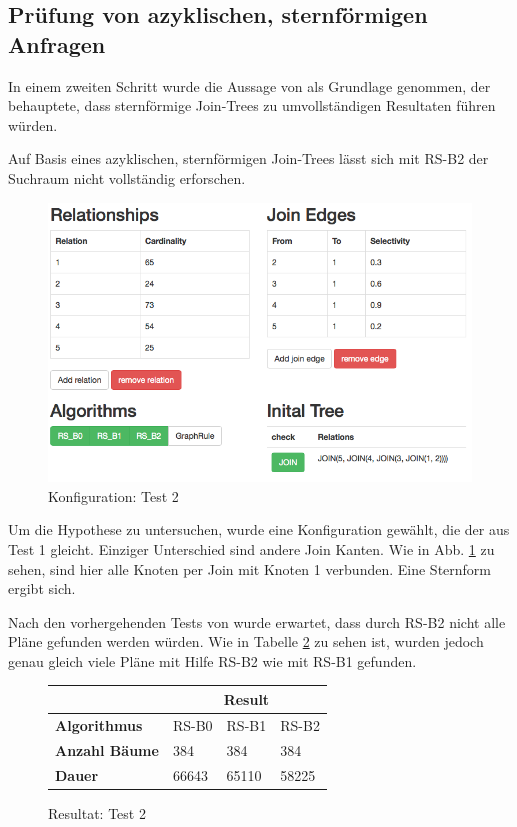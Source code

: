 \subsection{Prüfung von azyklischen, sternförmigen Anfragen}

In einem zweiten Schritt wurde die Aussage von \cite{shanbhag2014optimizing} als Grundlage genommen, der behauptete, dass sternförmige Join-Trees zu umvollständigen Resultaten führen würden.


\begin{hypo}
Auf Basis eines azyklischen, sternförmigen Join-Trees lässt sich mit RS-B2 der Suchraum nicht vollständig erforschen.
\end{hypo}


\begin{figure}[ht]
  \centering
  \includegraphics[width=\textwidth]{05_ResultsEvaluation/00_media/Test2.png}
  \caption{Konfiguration: Test 2}
  \label{Konfiguration:Test2}
\end{figure}


Um die Hypothese zu untersuchen, wurde eine Konfiguration gewählt, die der aus Test 1 gleicht. Einziger Unterschied sind andere Join Kanten. Wie in  Abb. \ref{Konfiguration:Test2} zu sehen, sind hier alle Knoten per Join mit Knoten 1 verbunden. Eine Sternform ergibt sich.

Nach den vorhergehenden Tests von \cite{shanbhag2014optimizing} wurde erwartet, dass durch RS-B2 nicht alle Pläne gefunden werden würden. Wie in Tabelle \ref{Result:Test2} zu sehen ist, wurden jedoch genau gleich viele Pläne mit Hilfe RS-B2 wie mit RS-B1 gefunden. 

\begin{figure}[ht]
\centering

\begin{tabular}{|l|l|l|l|}
\hline
                         & \multicolumn{3}{c|}{{\bf Result}} \\ \hline
{\bf Algorithmus}        & RS-B0     & RS-B1     & RS-B2     \\ \hline
{\bf Anzahl Bäume}       & 384       & 384       & 384       \\ \hline
{\bf Dauer}              & 66643  & 65110  & 58225   \\ \hline
\end{tabular}

\caption{Resultat: Test 2}
\label{Result:Test2}
\end{figure}



